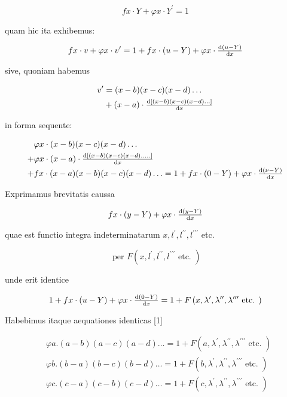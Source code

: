 \documentclass[twoside,12pt, showframe]{memoir}
\let\oldfrac\frac
\def\frac#1#2{\mathchoice{\tfrac{#1}{#2}}{\oldfrac{#1}{#2}}{\genfrac{}{}{}{2}{#1}{#2\mathstrut}}{\genfrac{}{}{}{3}{#1}{#2\mathstrut}}}
\begin{document}
\[
f x \cdot Y+\varphi x \cdot Y^{\prime}=1
\]

quam hic ita exhibemus:

\[
f x \cdot v+\varphi x \cdot v^{\prime}=1+f x \cdot(u-Y)+\varphi x \cdot \frac{\mathrm{d}(u-Y)}{\mathrm{d} x}
\]

sive, quoniam habemus

\[
\begin{aligned}
v^{\prime} & =(x-b)(x-c)(x-d) \ldots \\
& +(x-a) \cdot \frac{\mathrm{d}[(x-b)(x-c)(x-d) \ldots]}{\mathrm{d} x}
\end{aligned}
\]

in forma sequente:

\[
\begin{aligned}
& \varphi x \cdot(x-b)(x-c)(x-d) \ldots \\
+ & \varphi x \cdot(x-a) \cdot \frac{\mathrm{d}[(x-b)(x-c)(x-d) \ldots . .]}{\mathrm{d} x} \\
+ & f x \cdot(x-a)(x-b)(x-c)(x-d) \ldots=1+f x \cdot(0-Y)+\varphi x \cdot \frac{\mathrm{d}(\nu-Y)}{\mathrm{d} x}
\end{aligned}
\]

Exprimamus brevitatis caussa

\[
f x \cdot(y-Y)+\varphi x \cdot \frac{\mathrm{d}(y-Y)}{\mathrm{d} x}
\]

quae est functio integra indeterminatarum \(x, l^{\prime}, l^{\prime \prime}, l^{\prime \prime \prime}\) etc.

\[
\text { per } F\left(x, l^{\prime}, l^{\prime \prime}, l^{\prime \prime \prime} \text { etc. }\right)
\]

unde erit identice

\[
1+f x \cdot(u-Y)+\varphi x \cdot \frac{\mathrm{d}(0-Y)}{\mathrm{d} x}=1+F\left(x, \lambda^{\prime}, \lambda^{\prime \prime}, \lambda^{\prime \prime \prime} \text { etc. }\right)
\]

Habebimus itaque aequationes identicas [1]

\[
\begin{aligned}
& \varphi a .(a-b)(a-c)(a-d) \ldots=1+F\left(a, \lambda^{\prime}, \lambda^{\prime \prime}, \lambda^{\prime \prime \prime} \text { etc. }\right) \\
& \varphi b .(b-a)(b-c)(b-d) \ldots=1+F\left(b, \lambda^{\prime}, \lambda^{\prime \prime}, \lambda^{\prime \prime \prime} \text { etc. }\right) \\
& \varphi c .(c-a)(c-b)(c-d) \ldots=1+F\left(c, \lambda^{\prime}, \lambda^{\prime \prime}, \lambda^{\prime \prime \prime} \text { etc. }\right)
\end{aligned}
\]
\end{document}
